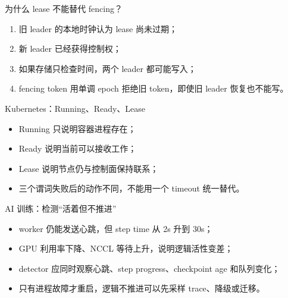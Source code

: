 \documentclass[UTF8,fontset=none,aspectratio=169,10pt]{beamer}
\begin{document}
\begin{frame}{为什么 lease 不能替代 fencing？}
\begin{enumerate}
  \item 旧 leader 的本地时钟认为 lease 尚未过期；
  \item 新 leader 已经获得控制权；
  \item 如果存储只检查时间，两个 leader 都可能写入；
  \item fencing token 用单调 epoch 拒绝旧 token，即使旧 leader 恢复也不能写。
\end{enumerate}
\end{frame}

\begin{frame}{Kubernetes：Running、Ready、Lease}
\begin{center}
\end{center}
\begin{itemize}
  \item Running 只说明容器进程存在；
  \item Ready 说明当前可以接收工作；
  \item Lease 说明节点仍与控制面保持联系；
  \item 三个谓词失败后的动作不同，不能用一个 timeout 统一替代。
\end{itemize}
\end{frame}

\begin{frame}{AI 训练：检测“活着但不推进”}
\begin{itemize}
  \item worker 仍能发送心跳，但 step time 从 2s 升到 30s；
  \item GPU 利用率下降、NCCL 等待上升，说明逻辑活性变差；
  \item detector 应同时观察心跳、step progress、checkpoint age 和队列变化；
  \item 只有进程故障才重启，逻辑不推进可以先采样 trace、降级或迁移。
\end{itemize}
\end{frame}
\end{document}
